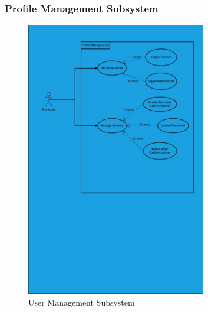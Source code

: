 \documentclass[11pt,a4paper]{article}
\begin{document}
\subsubsection*{Profile Management Subsystem}
\begin{figure}[htbp]
    \centering
    \includegraphics[width=0.7\textwidth]{Profile_Management_2.jpg}
    \caption{User Management Subsystem}
\end{figure}
\pagebreak
\end{document}
